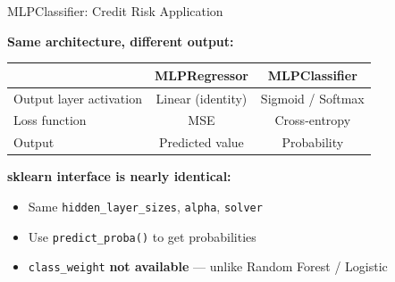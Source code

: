 \documentclass[10pt]{beamer}
\newcommand{\highlight}[1]{\textcolor{AccentOrange}{\textbf{#1}}}
\begin{document}
\begin{frame}{MLPClassifier: Credit Risk Application}

  \textbf{Same architecture, different output:}

  \vspace{0.5em}
  \begin{center}
  \begin{tabular}{lcc}
    \toprule
    & \textbf{MLPRegressor} & \textbf{MLPClassifier} \\
    \midrule
    Output layer activation & Linear (identity) & Sigmoid / Softmax \\
    Loss function & MSE & Cross-entropy \\
    Output & Predicted value & Probability \\
    \bottomrule
  \end{tabular}
  \end{center}

  \vspace{1em}
  \textbf{sklearn interface is nearly identical:}
  \begin{itemize}
    \item Same \texttt{hidden\_layer\_sizes}, \texttt{alpha}, \texttt{solver}
    \item Use \texttt{predict\_proba()} to get probabilities
    \item \texttt{class\_weight} \highlight{not available} --- unlike Random Forest / Logistic
  \end{itemize}
\end{frame}

\end{document}
